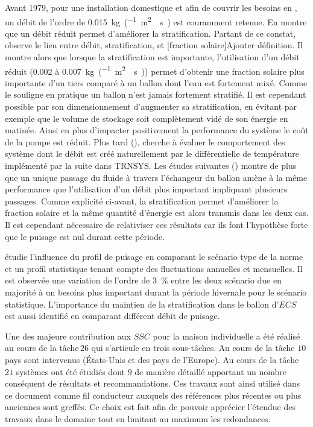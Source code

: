 Avant 1979, pour une installation domestique et afin de couvrir les besoins
en , un débit de l’ordre de \SI{0.015}{kg\per(\metre\squared\period\second)}
est couramment retenue. En  montre que un débit réduit
permet d’améliorer la stratification. Partant de ce constat, 
observe le lien entre débit, stratification, et [fraction solaire]{Ajouter définition}.
Il montre alors que lorsque la stratification est importante, l’utilisation d’un débit
réduit (\num{0.002} à \SI{0.007}{kg\per(\metre\squared\period\second)}) permet
d’obtenir une fraction solaire plus importante d’un tiers comparé à un ballon dont
l’eau est fortement mixé. Comme le souligne  en pratique
un ballon n’est jamais fortement stratifié. Il est cependant possible par son dimensionnement
d’augmenter sa stratification, en évitant par exemple que le volume de stockage soit
complètement vidé de son énergie en matinée. Ainsi en plus d’impacter positivement
la performance du système le coût de la pompe est réduit. Plus tard (),
cherche à évaluer le comportement des système dont le débit est créé naturellement
par le différentielle de température implémenté par la suite dans TRNSYS. Les études
suivantes () montre de plus que un unique
passage du fluide à travers l’échangeur du ballon amène à la même performance que
l’utilisation d’un débit plus important impliquant plusieurs passages. Comme explicité
ci-avant, la stratification permet d’améliorer la fraction solaire et la même
quantité d’énergie est alors transmis dans les deux cas. Il est cependant nécessaire de relativiser ces
résultats car ils font l’hypothèse forte que le puisage est nul durant cette période.

\textcite{Jordan2001197} étudie l’influence du profil de puisage en comparant le
scénario type de la norme  et un profil statistique tenant compte
des fluctuations annuelles et mensuelles. Il est observée une variation de l’ordre
de \SI{3}{\percent} entre les deux scénario due en majorité à un besoins plus
important durant la période hivernale pour le scénario statistique.
L’importance du maintien de la stratification dans le ballon d’$ECS$ est aussi identifié
en comparant différent débit de puisage.



Une des majeure contribution aux $SSC$ pour la maison individuelle a été réalisé au cours
de la tâche\,$26$ \parencite{Task26C2003} qui s’articule en trois sous-tâches. Au cours
de la tâche $10$ pays sont intervenus (États-Unis et des pays de l’Europe). Au cours
de la tâche $21$ systèmes ont été étudiés dont $9$ de manière détaillé apportant
un nombre conséquent de résultats et recommandations.
Ces travaux sont ainsi utilisé dans ce document comme fil conducteur auxquels des
références plus récentes ou plus anciennes sont greffés. Ce choix est fait afin
de pouvoir apprécier l’étendue des travaux dans le domaine tout en limitant au
maximum les redondances.

